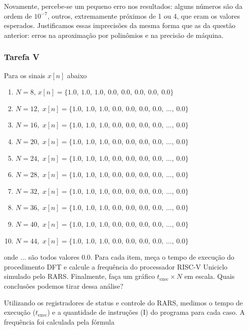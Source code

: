 \documentclass[a4paper,12pt]{article}
\begin{document}
Novamente, percebe-se um pequeno erro nos resultados: alguns números são da ordem de $10^{-7}$, outros, extremamente próximos de 1 ou 4, que eram os valores esperados. Justificamos essas imprecisões da mesma forma que as da questão anterior: erros na aproximação por polinômios e na precisão de máquina.

\subsubsection{Tarefa V}
\begin{tcolorbox}[title=Enunciado, colback=blue!5!white, colframe=blue!75!black]
Para os sinais $x[n]$ abaixo
\begin{enumerate}[label=\alph*), itemsep=0pt]
    \item $N=8$, $x[n]=\{1.0,\ 1.0,\ 1.0,\ 0.0,\ 0.0,\ 0.0,\ 0.0 ,\ 0.0\} $
    \item $N=12$,\ $x[n]=\{1.0,\ 1.0,\ 1.0,\ 0.0,\ 0.0,\ 0.0,\ 0.0 ,\ \dots,\ 0.0\}$ 
    \item $N=16$,\ $x[n]=\{1.0,\ 1.0,\ 1.0,\ 0.0,\ 0.0,\ 0.0,\ 0.0 ,\ \dots,\ 0.0\}$ 
    \item $N=20$,\ $x[n]=\{1.0,\ 1.0,\ 1.0,\ 0.0,\ 0.0,\ 0.0,\ 0.0 ,\ \dots,\ 0.0\}$ 
    \item $N=24$,\ $x[n]=\{1.0,\ 1.0,\ 1.0,\ 0.0,\ 0.0,\ 0.0,\ 0.0 ,\ \dots,\ 0.0\}$ 
    \item $N=28$,\ $x[n]=\{1.0,\ 1.0,\ 1.0,\ 0.0,\ 0.0,\ 0.0,\ 0.0 ,\ \dots,\ 0.0\}$ 
    \item $N=32$,\ $x[n]=\{1.0,\ 1.0,\ 1.0,\ 0.0,\ 0.0,\ 0.0,\ 0.0 ,\ \dots,\ 0.0\}$ 
    \item $N=36$,\ $x[n]=\{1.0,\ 1.0,\ 1.0,\ 0.0,\ 0.0,\ 0.0,\ 0.0 ,\ \dots,\ 0.0\}$ 
    \item $N=40$,\ $x[n]=\{1.0,\ 1.0,\ 1.0,\ 0.0,\ 0.0,\ 0.0,\ 0.0 ,\ \dots,\ 0.0\}$ 
    \item $N=44$,\ $x[n]=\{1.0,\ 1.0,\ 1.0,\ 0.0,\ 0.0,\ 0.0,\ 0.0 ,\ \dots,\ 0.0\}$
\end{enumerate}
onde $\dots$ são todos valores 0.0. Para cada item, meça o tempo de execução do procedimento DFT e calcule a frequência do processador RISC-V Uniciclo simulado pelo RARS. Finalmente, faça um gráfico $t_{\mathrm{exec}} \times N$ em escala. Quais conclusões podemos tirar dessa análise?
\end{tcolorbox}
Utilizando os registradores de status e controle do RARS, medimos o tempo de execução ($t_{\mathrm{exec}}$) e a quantidade de instruções ($\mathrm{I}$) do programa para cada caso. A frequência foi calculada pela fórmula
\end{document}

